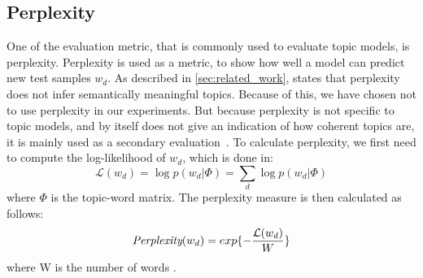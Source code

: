 \subsection{Perplexity}\label{app:perplexity}
One of the evaluation metric, that is commonly used to evaluate topic models, is perplexity.
Perplexity is used as a metric, to show how well a model can predict new test samples $w_d$.
As described in \autoref{sec:related_work}, \citet{tea_leaves} states that perplexity does not infer semantically meaningful topics.
Because of this, we have chosen not to use perplexity in our experiments.
But because perplexity is not specific to topic models, and by itself does not give an indication of how coherent topics are, it is mainly used as a secondary evaluation~\cite{tea_leaves}.
To calculate perplexity, we first need to compute the log-likelihood of $w_d$, which is done in:
\begin{equation}\label{eq:likelihood}
	\mathcal{L}(w_d) = \log p(w_d|\Phi) = \sum_{d} \log p(w_d|\Phi)
\end{equation}
\noindent where $\Phi$ is the topic-word matrix.
The perplexity measure is then calculated as follows:
\begin{equation}
	\emph{Perplexity}(w_d) = exp \{-\frac{\mathcal{L}(w_d)}{W}\}
\end{equation}
\noindent where W is the number of words \cite{de2008evaluating}.

